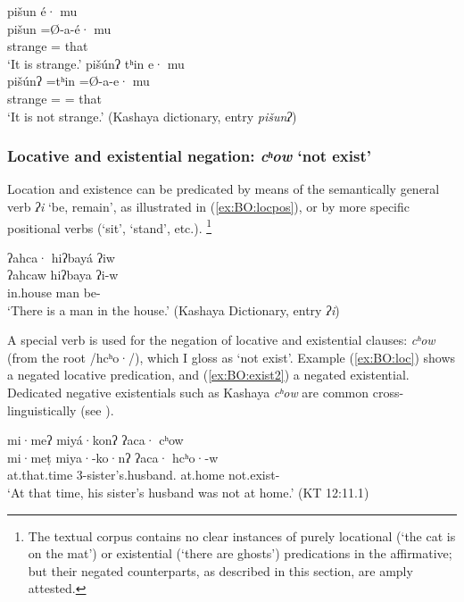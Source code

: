 \documentclass[output=paper,modfonts,nonflat,colorlinks,citecolor=brown]{langscibook}
\begin{document}
\ea 
\label{ex:BO:adj}
\begin{xlist}
\ex
\glll  pišun é· mu\\
      pišun =\O-a-é· mu\\
      strange = that\\
\glt `It is strange.'
\ex
\glll  pišúnʔ tʰin e· mu\\
      pišúnʔ =tʰin =\O-a-e· mu\\
      strange = = that\\
\glt `It is not strange.' ({Kashaya dictionary, entry \textit{pišunʔ}})\\
\end{xlist}
\z


\subsubsection{Locative and existential negation: \textit{cʰow} `not exist'}
\label{sec:BO:chow}

Location and existence can be predicated by means of the semantically general verb \textit{ʔi} `be, remain', as illustrated in (\ref{ex:BO:locpos}), or by more specific positional verbs (`sit', `stand', etc.).%
\footnote{%
The textual corpus contains no clear instances of purely locational (`the cat is on the mat') or existential (`there are ghosts') predications in the affirmative; but their negated counterparts, as described in this section, are amply attested.
} %

{%
\ea 
\label{ex:BO:locpos}
\glll ʔahca· hiʔbayá ʔiw\\
 ʔahcaw hiʔbaya ʔi-w\\
 in.house man be-\\
\glt `There is a man in the house.' ({Kashaya Dictionary, entry \textit{ʔi}})\\
\z
}%

\noindent A special verb is used for the negation of locative and existential clauses: \textit{cʰow} (from the root /hcʰo·/), which I gloss as `not exist'.
Example (\ref{ex:BO:loc}) shows a negated locative predication, and (\ref{ex:BO:exist2}) a negated existential. Dedicated negative existentials such as Kashaya \textit{cʰow} are common cross-linguistically (see \citealt{Veselinova2013neg.exist}).

\ea 
\label{ex:BO:loc}
\glll mi·meʔ miyá·konʔ ʔaca· cʰow\\
    mi·meṭ miya·-ko·nʔ ʔaca· hcʰo·-w\\
    at.that.time 3-sister's.husband. at.home not.exist-\\
\glt `At that time, his sister’s husband was not at home.' ({KT 12:11.1})\\ %
\z
\end{document}
